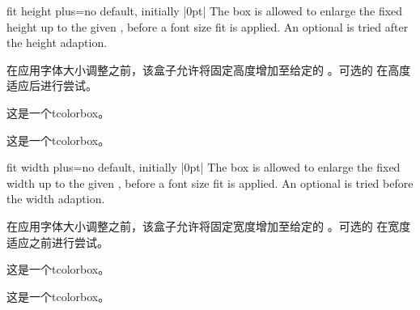  
\begin{docTcbKey}{fit height plus}{=}{no default, initially |0pt|}
The box is allowed to enlarge the fixed height up to the given ,
before a font size fit is applied. An optional 
is tried after the height adaption.

在应用字体大小调整之前，该盒子允许将固定高度增加至给定的 。可选的  在高度适应后进行尝试。
\begin{dispExample}

\begin{tcolorbox}[fit]
这是一个tcolorbox。
\end{tcolorbox}
\begin{tcolorbox}[fit,fit height plus=1cm]
这是一个tcolorbox。
\end{tcolorbox}
\begin{tcolorbox}[fit]
\lipsum[2]
\end{tcolorbox}
\begin{tcolorbox}[fit,fit height plus=1cm]
\lipsum[2]
\end{tcolorbox}
\end{dispExample}
\end{docTcbKey}


\begin{docTcbKey}{fit width plus}{=}{no default, initially |0pt|}
The box is allowed to enlarge the fixed width up to the given ,
before a font size fit is applied. An optional 
is tried before the width adaption.

在应用字体大小调整之前，该盒子允许将固定宽度增加至给定的 。可选的  在宽度适应之前进行尝试。
\begin{dispExample}

\begin{tcolorbox}[fit]
这是一个tcolorbox。
\end{tcolorbox}
\begin{tcolorbox}[fit,fit width plus=1cm]
这是一个tcolorbox。
\end{tcolorbox}
\begin{tcolorbox}[fit]
\lipsum[2]
\end{tcolorbox}
\begin{tcolorbox}[fit,fit width plus=1cm]
\lipsum[2]
\end{tcolorbox}
\end{dispExample}
\end{docTcbKey}


